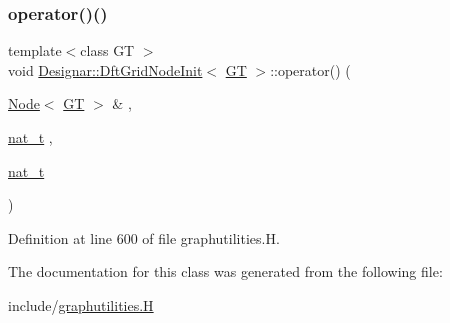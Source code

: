\subsubsection{\texorpdfstring{operator()()}{operator()()}}
{\footnotesize\ttfamily template$<$class GT $>$ \\
void \hyperlink{class_designar_1_1_dft_grid_node_init}{Designar\+::\+Dft\+Grid\+Node\+Init}$<$ \hyperlink{demo-buildgraph_8_c_a3001c40d2c31ca87ed96cd7d1334a55e}{GT} $>$\+::operator() (\begin{DoxyParamCaption}\item[{\hyperlink{namespace_designar_a5af326c65aa2bd26b26c410f2030d09e}{Node}$<$ \hyperlink{demo-buildgraph_8_c_a3001c40d2c31ca87ed96cd7d1334a55e}{GT} $>$ \&}]{,  }\item[{\hyperlink{namespace_designar_aa72662848b9f4815e7bf31a7cf3e33d1}{nat\+\_\+t}}]{,  }\item[{\hyperlink{namespace_designar_aa72662848b9f4815e7bf31a7cf3e33d1}{nat\+\_\+t}}]{ }\end{DoxyParamCaption})\hspace{0.3cm}{\ttfamily [inline]}}



Definition at line 600 of file graphutilities.\+H.



The documentation for this class was generated from the following file\+:\begin{DoxyCompactItemize}
\item 
include/\hyperlink{graphutilities_8_h}{graphutilities.\+H}\end{DoxyCompactItemize}
